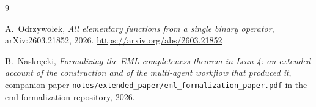\documentclass[11pt,a4paper]{article}
\begin{document}
\begin{thebibliography}{9}

A.~Odrzywołek,
\emph{All elementary functions from a single binary operator},
arXiv:2603.21852, 2026.
\url{https://arxiv.org/abs/2603.21852}

B.~Naskręcki,
\emph{Formalizing the EML completeness theorem in Lean 4: an
extended account of the construction and of the multi-agent
workflow that produced it},
companion paper
\texttt{notes/extended\_paper/eml\_formalization\_paper.pdf} in the
\href{https://github.com/nasqret/eml-formalization}{eml-formalization}
repository, 2026.

\end{thebibliography}
\end{document}
